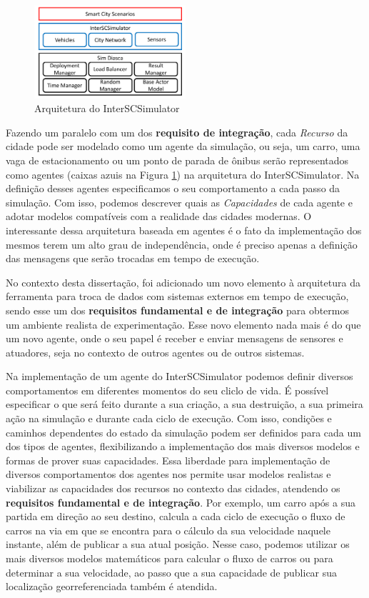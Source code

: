 \begin{figure}[ht]
	\centering
	\includegraphics[width=0.5\textwidth]{figuras/Arquitetura.pdf}
	\caption{Arquitetura do InterSCSimulator}
	\label{fig:simulator_architecture}
\end{figure}

Fazendo um paralelo com um dos \textbf{requisito de integração}, cada \textit{Recurso} da cidade pode ser modelado como um agente da simulação, ou seja, um carro, uma vaga de estacionamento ou um ponto
de parada de ônibus serão representados como agentes (caixas azuis na Figura \ref{fig:simulator_architecture}) na arquitetura do InterSCSimulator.
Na definição desses agentes especificamos o seu comportamento a cada passo da simulação.
Com isso, podemos descrever quais as \textit{Capacidades} de cada agente e adotar modelos compatíveis com a realidade das cidades modernas.
O interessante dessa arquitetura baseada em agentes é o fato da implementação dos mesmos terem um alto grau de independência, onde é preciso apenas a definição das mensagens que serão trocadas em tempo
de execução.

No contexto desta dissertação, foi adicionado um novo elemento à arquitetura da ferramenta para troca de dados com sistemas externos em tempo de execução,
sendo esse um dos \textbf{requisitos fundamental e de integração} para obtermos um ambiente realista de experimentação.
Esse novo elemento nada mais é do que um novo agente, onde o seu papel é receber e enviar mensagens de sensores e atuadores, seja no contexto de outros agentes ou de outros sistemas.

Na implementação de um agente do InterSCSimulator podemos definir diversos comportamentos em diferentes momentos do seu cliclo de vida.
É possível especificar o que será feito durante a sua criação, a sua destruição, a sua primeira ação na simulação e durante cada ciclo de execução.
Com isso, condições e caminhos dependentes do estado da simulação podem ser definidos para cada um dos tipos de agentes, flexibilizando a implementação dos
mais diversos modelos e formas de prover suas capacidades.
Essa liberdade para implementação de diversos comportamentos dos agentes nos permite usar modelos realistas e viabilizar as capacidades dos recursos no contexto das cidades,
atendendo os \textbf{requisitos fundamental e de integração}.
Por exemplo, um carro após a sua partida em direção ao seu destino, calcula a cada ciclo de execução o fluxo de carros na via em que se encontra para o cálculo da
sua velocidade naquele instante, além de publicar a sua atual posição.
Nesse caso, podemos utilizar os mais diversos modelos matemáticos para calcular o fluxo de carros ou para determinar a sua velocidade, ao passo que a sua capacidade
de publicar sua localização georreferenciada também é atendida.

